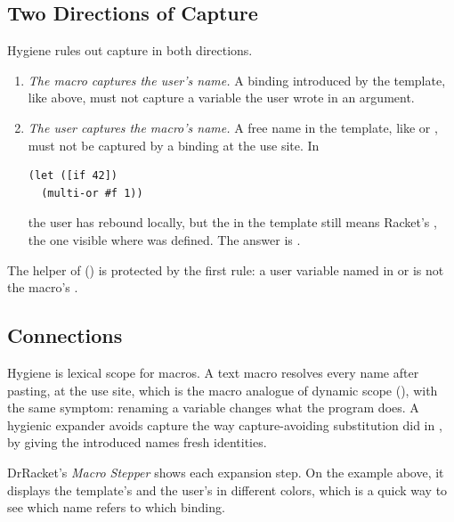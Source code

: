 \subsection{Two Directions of Capture}

Hygiene rules out capture in both directions.
\begin{enumerate}
  \item \emph{The macro captures the user's name.} A binding introduced by the template, like  above, must not capture a variable the user wrote in an argument.
  \item \emph{The user captures the macro's name.} A free name in the template, like  or , must not be captured by a binding at the use site. In
\begin{lstlisting}
(let ([if 42])
  (multi-or #f 1))
\end{lstlisting}
  the user has rebound  locally, but the  in the template still means Racket's , the one visible where  was defined. The answer is .
\end{enumerate}
The  helper of  () is protected by the first rule: a user variable named  in  or  is not the macro's .

\subsection{Connections}

\begin{keypoint}
Hygiene is lexical scope for macros. A text macro resolves every name after pasting, at the use site, which is the macro analogue of dynamic scope (), with the same symptom: renaming a variable changes what the program does. A hygienic expander avoids capture the way capture-avoiding substitution did in , by giving the introduced names fresh identities.
\end{keypoint}

\begin{remark}
DrRacket's \emph{Macro Stepper} shows each expansion step. On the example above, it displays the template's  and the user's  in different colors, which is a quick way to see which name refers to which binding.
\end{remark}
